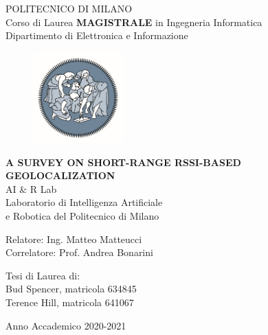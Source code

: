 \documentclass[12pt]{report}
\begin{document}

\thispagestyle{empty}
\vspace*{-1.5cm} \bfseries{
\begin{center}
  \large
  POLITECNICO DI MILANO\\
  \normalsize
  Corso di Laurea \textbf{MAGISTRALE} in Ingegneria Informatica\\
  Dipartimento di Elettronica e Informazione\\
  \begin{figure}[htbp]
    \begin{center}
      \includegraphics[width=3.5cm]{./pictures/logopm.jpg}
    \end{center}
  \end{figure}
  \vspace*{0.3cm} \LARGE



  \textbf{A SURVEY ON SHORT-RANGE RSSI-BASED GEOLOCALIZATION}\\



  \vspace*{.75truecm} \large
  AI \& R Lab \\
  Laboratorio di Intelligenza Artificiale \\
  e Robotica del Politecnico di Milano
\end{center}
\vspace*{3.0cm} \large
\begin{flushleft}


  Relatore: Ing. Matteo Matteucci \\
  Correlatore: Prof. Andrea Bonarini 

\end{flushleft}
\vspace*{1.0cm}
\begin{flushright}


  Tesi di Laurea di:\\ Bud Spencer, matricola 634845 \\ 
		       Terence Hill, matricola 641067 \\


\end{flushright}
\vspace*{0.5cm}
\begin{center}



  Anno Accademico 2020-2021
\end{center} \clearpage
}
\thispagestyle{empty}  \normalfont \cleardoublepage
\newpage
\end{document}

